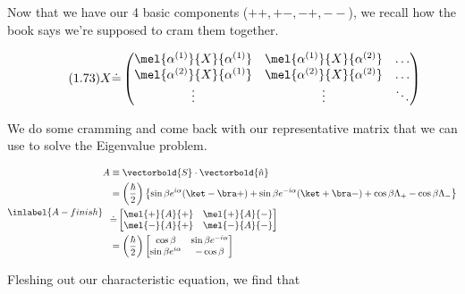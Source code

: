 \begin{answer}
  Now that we have our 4 basic components ($++, +-, -+, --$), we
  recall how the book says we're supposed to cram them together.
  
  \begin{equation}
    \tag{1.73}
    X \dot{=}
    \begin{pmatrix}
      \mel{\alpha^{(1)}}{X}{\alpha^{(1)}} & \mel{\alpha^{(1)}}{X}{\alpha^{(2)}} & \ldots \\
      \mel{\alpha^{(2)}}{X}{\alpha^{(1)}} & \mel{\alpha^{(2)}}{X}{\alpha^{(2)}} & \ldots \\
      \vdots & \vdots & \ddots\\
    \end{pmatrix}
  \end{equation}

  We do some cramming and come back with our representative matrix
  that we can use to solve the Eigenvalue problem.
  
  \begin{equation}
    \inlabel{A-finish}
    \begin{split}
      A
      &\equiv \vectorbold{S}\cdot\vectorbold{\hat{n}}\\
      &= \left(\frac \hbar 2\right)\left\{
        \sin{\beta}e^{i\alpha}(\ket - \bra +)
        + \sin{\beta}e^{-i\alpha}(\ket + \bra -)
        + \cos{\beta}\Lambda_+
        - \cos{\beta}\Lambda_-
      \right\}\\
      &\dot{=}
      \begin{bmatrix}
        \mel{+}{A}{+} & \mel{+}{A}{-}\\
        \mel{-}{A}{+} & \mel{-}{A}{-}\\
      \end{bmatrix}\\
      &=
      \left(\frac{\hbar}{2}\right)
      \begin{bmatrix}
        \cos{\beta} & \sin{\beta}e^{-i\alpha}\\
        \sin{\beta}e^{i\alpha} & -\cos{\beta}\\
      \end{bmatrix}\\
    \end{split}
  \end{equation}

  Fleshing out our characteristic equation, we find that
  

\end{answer}
